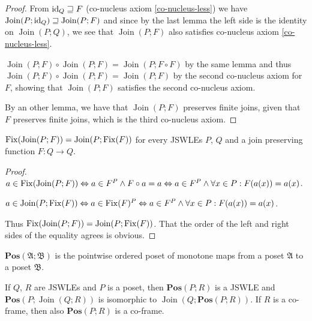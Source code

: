 \begin{proof}
From $\operatorname{id}_{Q}\sqsupseteq F$ (co-nucleus axiom \ref{co-nucleus-less})
we have $\operatorname{Join}(P;\operatorname{id}_{Q})\sqsupseteq\operatorname{Join}(P;F)$
and since by the last lemma the left side is the identity on $\operatorname{Join}(P;Q)$,
we see that $\operatorname{Join}(P;F)$ also satisfies co-nucleus
axiom \ref{co-nucleus-less}.

$\operatorname{Join}(P;F)\circ\operatorname{Join}(P;F)=\operatorname{Join}(P;F\circ F)$
by the same lemma and thus $\operatorname{Join}(P;F)\circ\operatorname{Join}(P;F)=\operatorname{Join}(P;F)$
by the second co-nucleus axiom for $F$, showing that $\operatorname{Join}(P;F)$
satisfies the second co-nucleus axiom.

By an other lemma, we have that $\operatorname{Join}(P;F)$ preserves
finite joins, given that $F$ preserves finite joins, which is the
third co-nucleus axiom.\end{proof}
\begin{lem}
\label{join-fix-inter}$\operatorname{Fix}(\operatorname{Join}(P;F))=\operatorname{Join}(P;\operatorname{Fix}(F))$
for every JSWLEs $P$, $Q$ and a join preserving function $F:Q\rightarrow Q$.\end{lem}
\begin{proof}
$a\in\operatorname{Fix}(\operatorname{Join}(P;F))\Leftrightarrow a\in F^{P}\wedge F\circ a=a\Leftrightarrow a\in F^{P}\wedge\forall x\in P:F(a(x))=a(x)$.

$a\in\operatorname{Join}(P;\operatorname{Fix}(F))\Leftrightarrow a\in\operatorname{Fix}(F)^{P}\Leftrightarrow a\in F^{P}\wedge\forall x\in P:F(a(x))=a(x)$.

Thus $\operatorname{Fix}(\operatorname{Join}(P;F))=\operatorname{Join}(P;\operatorname{Fix}(F))$.
That the order of the left and right sides of the equality agrees
is obvious.\end{proof}
\begin{defn}
$\mathbf{Pos}(\mathfrak{A};\mathfrak{B})$ is the pointwise ordered
poset of monotone maps from a poset $\mathfrak{A}$ to a poset $\mathfrak{B}$.\end{defn}
\begin{lem}
\label{join-pos-interch}If $Q$, $R$ are JSWLEs and $P$ is a poset,
then $\mathbf{Pos}(P;R)$ is a JSWLE and $\mathbf{Pos}(P;\operatorname{Join}(Q;R))$
is isomorphic to $\operatorname{Join}\left(Q;\mathbf{Pos}(P;R)\right)$.
If $R$ is a co-frame, then also $\mathbf{Pos}(P;R)$ is a co-frame.
\end{lem}
